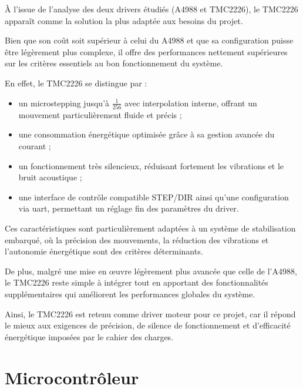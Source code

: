 À l'issue de l'analyse des deux drivers étudiés (A4988 et TMC2226), le TMC2226 apparaît comme la solution la plus adaptée aux besoins du projet.

Bien que son coût soit supérieur à celui du A4988 et que sa configuration puisse être légèrement plus complexe, il offre des performances nettement supérieures sur les critères essentiels au bon fonctionnement du système.

En effet, le TMC2226 se distingue par :

\begin{itemize}
    \item un microstepping jusqu'à $\frac{1}{256}$ avec interpolation interne, offrant un mouvement particulièrement fluide et précis ;
    \item une consommation énergétique optimisée grâce à sa gestion avancée du courant ;
    \item un fonctionnement très silencieux, réduisant fortement les vibrations et le bruit acoustique ;
    \item une interface de contrôle compatible STEP/DIR ainsi qu'une configuration via \Gls{uart}, permettant un réglage fin des paramètres du driver.
\end{itemize}

Ces caractéristiques sont particulièrement adaptées à un système de stabilisation embarqué, où la précision des mouvements, la réduction des vibrations et l'autonomie énergétique sont des critères déterminants.

De plus, malgré une mise en œuvre légèrement plus avancée que celle de l'A4988, le TMC2226 reste simple à intégrer tout en apportant des fonctionnalités supplémentaires qui améliorent les performances globales du système.

Ainsi, le TMC2226 est retenu comme driver moteur pour ce projet, car il répond le mieux aux exigences de précision, de silence de fonctionnement et d'efficacité énergétique imposées par le cahier des charges.

\section{Microcontrôleur}
